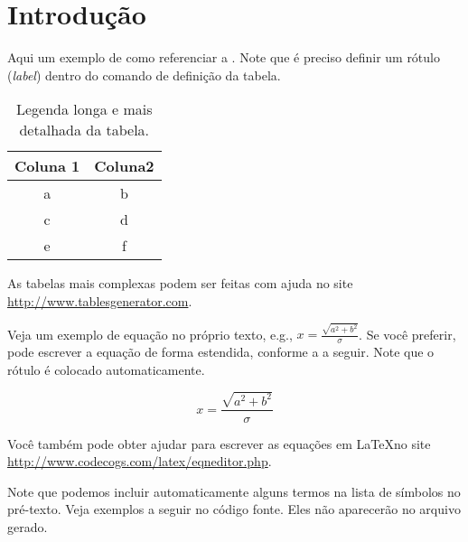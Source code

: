 \chapter{Introdução}\label{chp:Introducao}

\lipsum[1]

Aqui um exemplo de como referenciar a . Note que é preciso definir um rótulo (\textit{label}) dentro do comando de definição da tabela.

\begin{table}[!htp]
\caption[Legenda curta da tabela]{Legenda longa e mais detalhada da tabela.}
\label{tab:tabela_1}
\begin{center}
\begin{tabular}{cc}
\toprule %
Coluna 1 & Coluna2 \\ \midrule %
a & b \\
c & d \\
e & f \\\bottomrule %
\end{tabular}
\end{center}
\end{table}

As tabelas mais complexas podem ser feitas com ajuda no site \href{http://www.tablesgenerator.com}{http://www.tables\-ge\-ne\-ra\-tor.com}.

Veja um exemplo de equação no próprio texto, e.g., $x=\frac{\sqrt{a^{2}+b^{2}}}{\sigma}$.  Se você preferir, pode escrever a equação de forma estendida, conforme a  a seguir. Note que o rótulo é colocado automaticamente.

\begin{equation}
x=\frac{\sqrt{a^{2}+b^{2}}}{\sigma}
\label{eq:teste}
\end{equation}

Você também pode obter ajudar para escrever as equações em \LaTeX no site \url{http://www.codecogs.com/latex/eqneditor.php}.

Note que podemos incluir automaticamente alguns termos na lista de símbolos no pré-texto. Veja exemplos a seguir no código fonte. Eles não aparecerão no arquivo gerado. 

